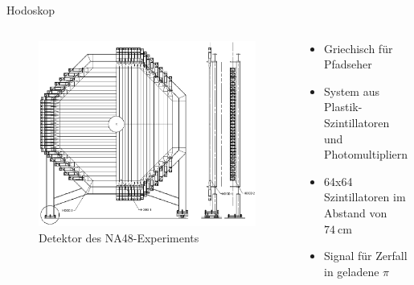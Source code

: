 \documentclass[aspectratio=1610, professionalfonts, 9pt, t]{beamer}
\begin{document}
  \begin{frame}{Hodoskop}
    \begin{columns}[onlytextwidth]
      \begin{column}{0.4\textwidth}
        \begin{figure}[ht]
          \begin{center}
            \vspace*{-1cm}
            \includegraphics[height=0.8\textheight]{Images/na48chodoskop.png} %
            \caption{Detektor des NA48-Experiments}
          \end{center}
        \end{figure}
      \end{column}
      \begin{column}{0.5\textwidth}
        \begin{itemize}
          \item Griechisch für Pfadseher
          \item System aus Plastik-Szintillatoren und Photomultipliern
          \item[\rightarrow] 64x64 Szintillatoren im Abstand von $\SI{74}{\centi\metre}$
          \item Signal für Zerfall in geladene $\pi$
        \end{itemize}
      \end{column}
    \end{columns}
  \end{frame}
\end{document}
